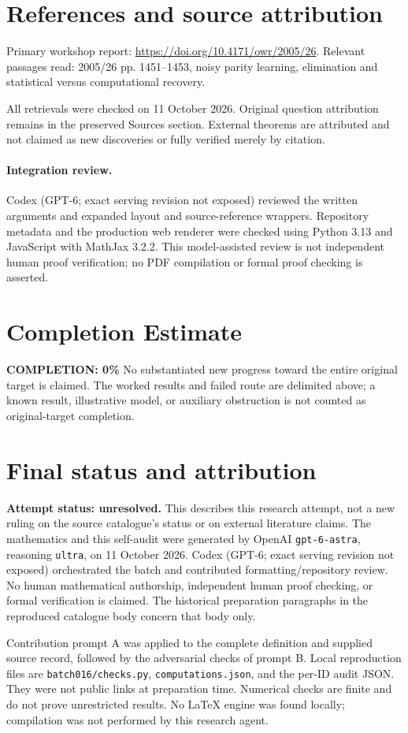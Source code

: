 \documentclass[11pt]{article}
\begin{document}
\section{References and source attribution}
Primary workshop report: \url{https://doi.org/10.4171/owr/2005/26}. Relevant passages read: 2005/26 pp. 1451--1453, noisy parity learning, elimination and statistical versus computational recovery.

All retrievals were checked on 11 October 2026. Original question attribution remains in the preserved Sources section. External theorems are attributed and not claimed as new discoveries or fully verified merely by citation.


\paragraph{Integration review.} Codex (GPT-6; exact serving revision not exposed) reviewed the written arguments and expanded layout and source-reference wrappers. Repository metadata and the production web renderer were checked using Python 3.13 and JavaScript with MathJax 3.2.2. This model-assisted review is not independent human proof verification; no PDF compilation or formal proof checking is asserted.

\section{Completion Estimate}
\noindent\textbf{COMPLETION: 0\%}
No substantiated new progress toward the entire original target is claimed. The worked results and failed route are delimited above; a known result, illustrative model, or auxiliary obstruction is not counted as original-target completion.

\section{Final status and attribution}
\textbf{Attempt status: unresolved.} This describes this research attempt, not a new ruling on the source catalogue's status or on external literature claims.
The mathematics and this self-audit were generated by OpenAI \texttt{gpt-6-astra}, reasoning \texttt{ultra}, on 11 October 2026. Codex (GPT-6; exact serving revision not exposed) orchestrated the batch and contributed formatting/repository review. No human mathematical authorship, independent human proof checking, or formal verification is claimed. The historical preparation paragraphs in the reproduced catalogue body concern that body only.

Contribution prompt A was applied to the complete definition and supplied source record, followed by the adversarial checks of prompt B. Local reproduction files are \texttt{batch016/checks.py}, \texttt{computations.json}, and the per-ID audit JSON. They were not public links at preparation time. Numerical checks are finite and do not prove unrestricted results. No LaTeX engine was found locally; compilation was not performed by this research agent.
\end{document}
